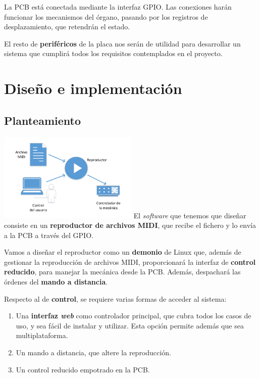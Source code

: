 \documentclass[10pt,a4paper]{article}
\begin{document}
	La PCB está conectada mediante la interfaz GPIO. Las conexiones harán funcionar los mecanismos del órgano, pasando por los registros de desplazamiento, que retendrán el estado.
	
	El resto de \textbf{periféricos} de la placa nos serán de utilidad para desarrollar un sistema que cumplirá todos los requisitos contemplados en el proyecto.
	
	
	\section{Diseño e implementación}
	
	\subsection{Planteamiento}
	
	\begin{multicols}{2}
		\noindent
		\includegraphics[width=0.5\textwidth]{images/idea} 
		\columnbreak
		El \textit{software} que tenemos que diseñar consiste en un \textbf{reproductor de archivos MIDI}, que recibe el fichero y lo envía a la PCB a través del GPIO.
		
		Vamos a diseñar el reproductor como un \textbf{demonio} de Linux que, además de gestionar la reproducción de archivos MIDI, proporcionará la interfaz de \textbf{control reducido}, para manejar la mecánica desde la PCB. Además, despachará las órdenes del \textbf{mando a distancia}.
	\end{multicols}
	
	Respecto al de \textbf{control}, se requiere varias formas de acceder al sistema:
	
	\begin{enumerate}
		\item Una \textbf{interfaz \textit{web}} como controlador principal, que cubra todos los casos de uso, y sea fácil de instalar y utilizar. Esta opción permite además que sea multiplataforma.
		
		\item Un mando a distancia, que altere la reproducción.
		
		\item Un control reducido empotrado en la PCB.
	\end{enumerate}
	
\end{document}
